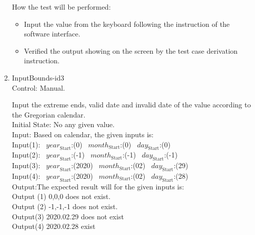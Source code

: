 \documentclass[12pt, titlepage]{article}
\begin{document}
\begin{enumerate}

How the test will be performed:

\begin{itemize} 

\item Input the value from the keyboard following the instruction of the
software interface.
\item Verified the output showing on the screen by the test case derivation
instruction.
\end{itemize}
\item{InputBounds-id3\\}
Control: Manual. 
  
 Input the extreme ends, valid date and invalid date of the value according to the Gregorian calendar. \\
Initial State: No any given value.\\

Input: Based on calendar, the given inputs is:\\ 
Input(1):
~$\mathit{year}_\text{Start}$:(0) ~$\mathit{month}_\text{Start}$:(0)
~$\mathit{day}_\text{Start}$:(0)\\  
Input(2):
~$\mathit{year}_\text{Start}$:(-1)
~$\mathit{month}_\text{Start}$:(-1) ~$\mathit{day}_\text{Start}$:(-1)\\

Input(3):
~$\mathit{year}_\text{Start}$:(2020)
~$\mathit{month}_\text{Start}$:(02) ~$\mathit{day}_\text{Start}$:(29)\\

Input(4):
~$\mathit{year}_\text{Start}$:(2020)
~$\mathit{month}_\text{Start}$:(02) ~$\mathit{day}_\text{Start}$:(28)\\



Output:The expected result will for the given inputs is:\\
Output (1) 0,0,0 does not exist.\\ 
Output (2) -1,-1,-1 does not exist.\\
 Output(3) 2020.02.29 does not exist\\ 
 Output(4) 2020.02.28 exist\\ 

 

\end{enumerate}
\end{document}
